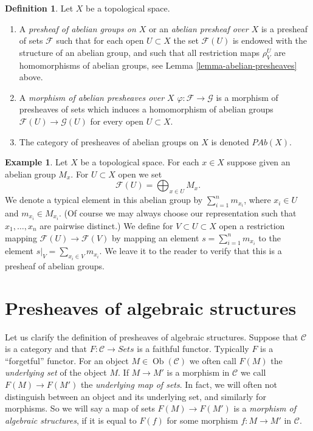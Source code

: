 \documentclass{stacks-project}
\theoremstyle{plain}
\theoremstyle{definition}
\newtheorem{definition}[subsection]{Definition}
\newtheorem{example}[subsection]{Example}
\theoremstyle{remark}
\numberwithin{equation}{subsection}
\def\Ob{\mathop{\mathrm{Ob}}\nolimits}
\begin{document}
\begin{definition}
\label{definition-abelian-presheaves}
Let $X$ be a topological space.
\begin{enumerate}
\item A {\it presheaf of abelian groups on $X$} or an
{\it abelian presheaf over $X$}
is a presheaf of sets $\mathcal{F}$ such that for each open
$U \subset X$ the set $\mathcal{F}(U)$ is endowed with
the structure of an abelian group, and such that all restriction
maps $\rho^U_V$ are homomorphisms of abelian groups, see
Lemma \ref{lemma-abelian-presheaves} above.
\item A {\it morphism of abelian presheaves over $X$}
$\varphi : \mathcal{F} \to \mathcal{G}$ is a morphism of presheaves
of sets which induces
a homomorphism of abelian groups $\mathcal{F}(U) \to \mathcal{G}(U)$
for every open $U \subset X$.
\item The category of presheaves of abelian groups on $X$ is denoted
$\textit{PAb}(X)$.
\end{enumerate}
\end{definition}

\begin{example}
\label{example-direct-sum-points}
Let $X$ be a topological space. For each $x \in X$ suppose
given an abelian group $M_x$. For $U \subset X$ open
we set
$$
\mathcal{F}(U) = \bigoplus\nolimits_{x \in U} M_x.
$$
We denote a typical element in this abelian group by
$\sum_{i = 1}^n m_{x_i}$, where $x_i \in U$ and $m_{x_i} \in M_{x_i}$.
(Of course we may always choose our representation such that
$x_1, \ldots, x_n$ are pairwise distinct.)
We define for $V \subset U \subset X$ open a restriction
mapping $\mathcal{F}(U) \to \mathcal{F}(V)$ by
mapping an element $s = \sum_{i = 1}^n m_{x_i}$
to the element $s|_V = \sum_{x_i \in V} m_{x_i}$.
We leave it to the reader to verify that this is a
presheaf of abelian groups.
\end{example}



\section{Presheaves of algebraic structures}
\label{section-presheaves-structures}

\noindent
Let us clarify the definition
of presheaves of algebraic structures.
Suppose that $\mathcal{C}$ is a category and
that $F : \mathcal{C} \to \textit{Sets}$ is
a faithful functor. Typically $F$ is a ``forgetful''
functor. For an object $M \in \Ob(\mathcal{C})$
we often call $F(M)$ the {\it underlying set} of the
object $M$. If $M \to M'$ is a morphism in $\mathcal{C}$
we call $F(M) \to F(M')$ the {\it underlying map of sets}.
In fact, we will often not distinguish between an object
and its underlying set, and similarly for morphisms.
So we will say a map of sets $F(M) \to F(M')$
is a {\it morphism of algebraic structures}, if it is
equal to $F(f)$ for some morphism $f : M \to M'$
in $\mathcal{C}$.
\end{document}

